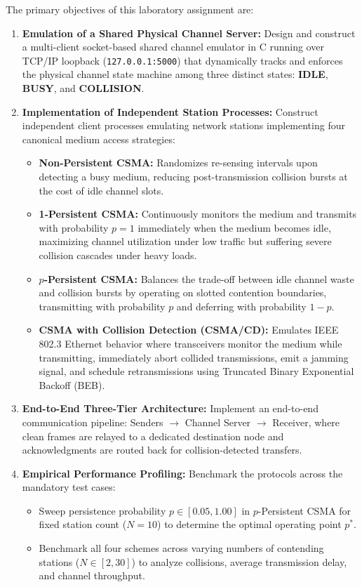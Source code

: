 \documentclass[11pt,a4paper]{article}
\begin{document}
The primary objectives of this laboratory assignment are:
\begin{enumerate}
    \item \textbf{Emulation of a Shared Physical Channel Server:} Design and construct a multi-client socket-based shared channel emulator in C running over TCP/IP loopback (\texttt{127.0.0.1:5000}) that dynamically tracks and enforces the physical channel state machine among three distinct states: \textbf{IDLE}, \textbf{BUSY}, and \textbf{COLLISION}.
    \item \textbf{Implementation of Independent Station Processes:} Construct independent client processes emulating network stations implementing four canonical medium access strategies:
    \begin{itemize}
        \item \textbf{Non-Persistent CSMA:} Randomizes re-sensing intervals upon detecting a busy medium, reducing post-transmission collision bursts at the cost of idle channel slots.
        \item \textbf{1-Persistent CSMA:} Continuously monitors the medium and transmits with probability $p=1$ immediately when the medium becomes idle, maximizing channel utilization under low traffic but suffering severe collision cascades under heavy loads.
        \item \textbf{$p$-Persistent CSMA:} Balances the trade-off between idle channel waste and collision bursts by operating on slotted contention boundaries, transmitting with probability $p$ and deferring with probability $1-p$.
        \item \textbf{CSMA with Collision Detection (CSMA/CD):} Emulates IEEE 802.3 Ethernet behavior where transceivers monitor the medium while transmitting, immediately abort collided transmissions, emit a jamming signal, and schedule retransmissions using Truncated Binary Exponential Backoff (BEB).
    \end{itemize}
    \item \textbf{End-to-End Three-Tier Architecture:} Implement an end-to-end communication pipeline: Senders $\to$ Channel Server $\to$ Receiver, where clean frames are relayed to a dedicated destination node and acknowledgments are routed back for collision-detected transfers.
    \item \textbf{Empirical Performance Profiling:} Benchmark the protocols across the mandatory test cases:
    \begin{itemize}
        \item Sweep persistence probability $p \in [0.05, 1.00]$ in $p$-Persistent CSMA for fixed station count ($N = 10$) to determine the optimal operating point $p^*$.
        \item Benchmark all four schemes across varying numbers of contending stations ($N \in [2, 30]$) to analyze collisions, average transmission delay, and channel throughput.
    \end{itemize}
\end{enumerate}
\end{document}
